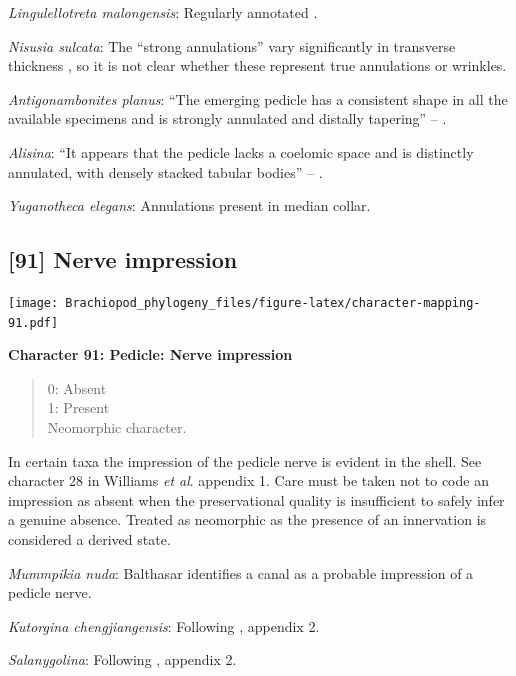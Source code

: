 \documentclass[openany]{book}
\theoremstyle{definition}
\theoremstyle{definition}
\theoremstyle{definition}
\theoremstyle{remark}
\begin{document}
\emph{Lingulellotreta malongensis}: Regularly annotated \citep[see fig.
14.9 in][]{Hou2017Brachiopoda}.

\emph{Nisusia sulcata}: The ``strong annulations'' vary significantly in
transverse thickness \citep{Holmer2018Evolutionarysignificance}, so it
is not clear whether these represent true annulations or wrinkles.

\emph{Antigonambonites planus}: ``The emerging pedicle has a consistent
shape in all the available specimens and is strongly annulated and
distally tapering'' -- \citet{Holmer2018Evolutionarysignificance}.

\emph{Alisina}: ``It appears that the pedicle lacks a coelomic space and
is distinctly annulated, with densely stacked tabular bodies'' --
\citet{Zhang2011Anobolellate}.

\emph{Yuganotheca elegans}: Annulations present in median collar.

\hypertarget{nerve-impression}{%
\subsection*{{[}91{]} Nerve impression}\label{nerve-impression}}

\texttt{[image: Brachiopod\_phylogeny\_files/figure-latex/character-mapping-91.pdf]}

\textbf{Character 91: Pedicle: Nerve impression}

\begin{quote}
0: Absent\\
1: Present\\
Neomorphic character.
\end{quote}

In certain taxa the impression of the pedicle nerve is evident in the
shell. See character 28 in Williams \emph{et al}.
\citeyearpar{Williams1998Thediversity} appendix 1. Care must be taken
not to code an impression as absent when the preservational quality is
insufficient to safely infer a genuine absence. Treated as neomorphic as
the presence of an innervation is considered a derived state.

\emph{Mummpikia nuda}: Balthasar
\citeyearpar[p.~274]{Balthasar2008iMummpikia} identifies a canal as a
probable impression of a pedicle nerve.

\emph{Kutorgina chengjiangensis}: Following
\citet{Williams1998Thediversity}, appendix 2.

\emph{Salanygolina}: Following \citet{Williams1998Thediversity},
appendix 2.
\end{document}

